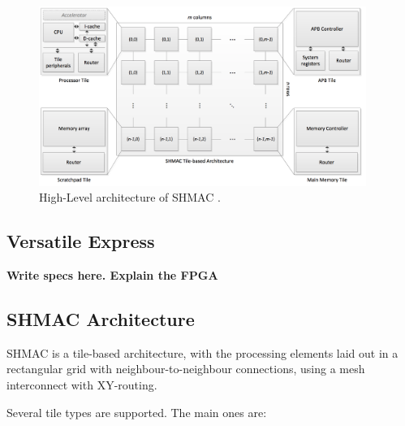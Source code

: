 \begin{figure}[htb]
    \centering
    \includegraphics[width=0.95\textwidth]{Figures/Heterogeneous/SHMAC}
    \caption{High-Level architecture of SHMAC \cite{shmac-plan}.}
    \label{fig:shmac}
\end{figure}

\subsection{Versatile Express}

\textbf{Write specs here. Explain the FPGA}

\subsection{SHMAC Architecture}

SHMAC is a tile-based architecture, with the processing elements laid out in a rectangular
grid with neighbour-to-neighbour connections, using a mesh interconnect with XY-routing.

Several tile types are supported. The main ones are:

